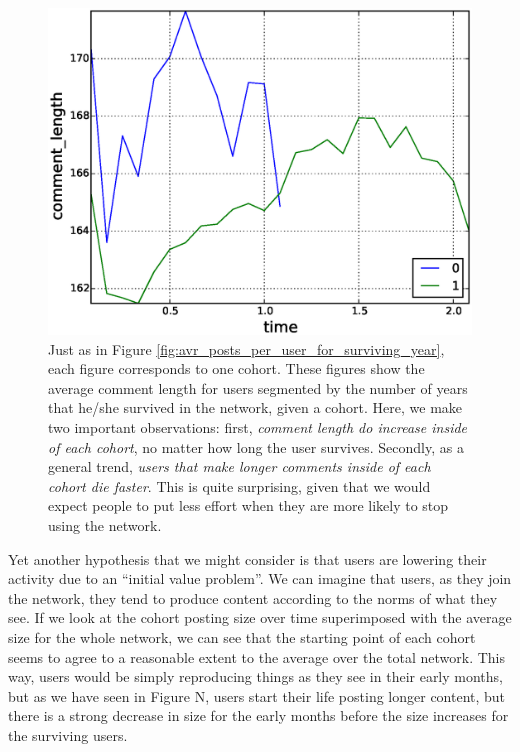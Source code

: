 \begin{figure}[!tb]
\includegraphics[scale=0.2]{./images/avr_comment_length_for_surviving_year_for_2013.eps}
\caption{Just as in Figure \ref{fig:avr_posts_per_user_for_surviving_year}, each figure corresponds to one cohort. These figures show the average comment length for users segmented by the number of years that he/she survived in the network, given a cohort. Here, we make two important observations: first, \textit{comment length do increase inside of each cohort}, no matter how long the user survives. Secondly, as a general trend, \textit{users that make longer comments inside of each cohort die faster}. This is quite surprising, given that we would expect people to put less effort when they are more likely to stop using the network.}
\label{fig:avr_comment_length_for_surviving_year}
\end{figure}

Yet another hypothesis that we might consider is that users are lowering their activity due to an ``initial value problem''. We can imagine that users, as they join the network, they tend to produce content according to the norms of what they see. If we look at the cohort posting size over time superimposed with the average size for the whole network, we can see that the starting point of each cohort seems to agree to a reasonable extent to the average over the total network. This way, users would be simply reproducing things as they see in their early months, but as we have seen in Figure N, users start their life posting longer content, but there is a strong decrease in size for the early months before the size increases for the surviving users.


